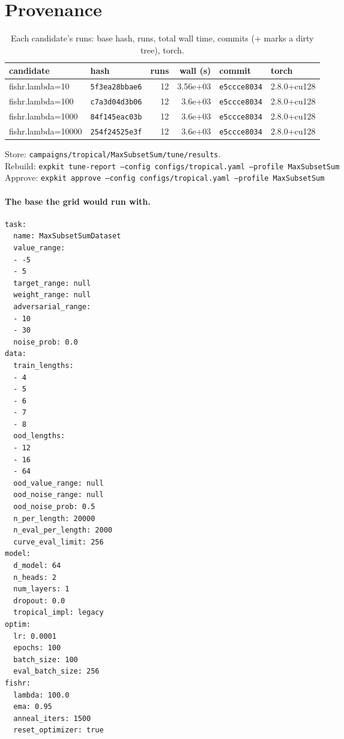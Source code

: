\documentclass[10pt]{article}
\begin{document}
\section{Provenance}
{\small
\begin{longtable}{llrrll}
\caption{Each candidate's runs: base hash, runs, total wall time, commits (+ marks a dirty tree), torch.}\label{tab:provenance}\\
\toprule
candidate & hash & runs & wall (s) & commit & torch\\
\midrule
\endhead
fishr.lambda=10 & \texttt{5f3ea28bbae6} & 12 & 3.56e+03 & \texttt{e5ccce8034} & 2.8.0+cu128\\
fishr.lambda=100 & \texttt{c7a3d04d3b06} & 12 & 3.6e+03 & \texttt{e5ccce8034} & 2.8.0+cu128\\
fishr.lambda=1000 & \texttt{84f145eac03b} & 12 & 3.6e+03 & \texttt{e5ccce8034} & 2.8.0+cu128\\
fishr.lambda=10000 & \texttt{254f24525e3f} & 12 & 3.6e+03 & \texttt{e5ccce8034} & 2.8.0+cu128\\
\bottomrule
\end{longtable}
}
\noindent Store: \texttt{campaigns/tropical/MaxSubsetSum/tune/results}.\\
Rebuild: \texttt{expkit tune-report --config configs/tropical.yaml --profile MaxSubsetSum}\\
Approve: \texttt{expkit approve --config configs/tropical.yaml --profile MaxSubsetSum}

\paragraph{The base the grid would run with.}
{\footnotesize
\begin{verbatim}
task:
  name: MaxSubsetSumDataset
  value_range:
  - -5
  - 5
  target_range: null
  weight_range: null
  adversarial_range:
  - 10
  - 30
  noise_prob: 0.0
data:
  train_lengths:
  - 4
  - 5
  - 6
  - 7
  - 8
  ood_lengths:
  - 12
  - 16
  - 64
  ood_value_range: null
  ood_noise_range: null
  ood_noise_prob: 0.5
  n_per_length: 20000
  n_eval_per_length: 2000
  curve_eval_limit: 256
model:
  d_model: 64
  n_heads: 2
  num_layers: 1
  dropout: 0.0
  tropical_impl: legacy
optim:
  lr: 0.0001
  epochs: 100
  batch_size: 100
  eval_batch_size: 256
fishr:
  lambda: 100.0
  ema: 0.95
  anneal_iters: 1500
  reset_optimizer: true
\end{verbatim}
}

\clearpage
\appendix
\end{document}
